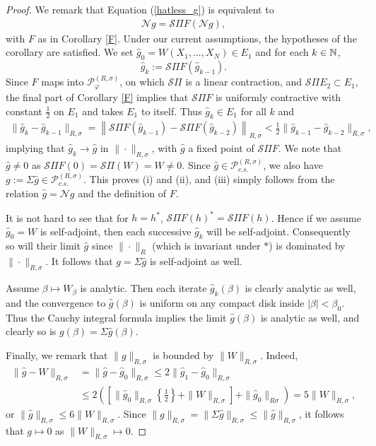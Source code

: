\begin{proof}
We remark that Equation (\ref{hatless_g}) is equivalent to
	\begin{align*}
		\mathscr{N}g=\mathscr{S}\Pi F(\mathscr{N} g),
	\end{align*}
with $F$ as in Corollary \ref{F}. Under our current assumptions, the hypotheses of the corollary are satisfied. We set $\hat{g}_0=W(X_1,\ldots, X_N)\in E_1$ and for each $k\in\mathbb{N}$,
	\begin{equation*}
		\hat{g}_k:=\mathscr{S}\Pi F(\hat{g}_{k-1}).
	\end{equation*}
Since $F$ maps into $\mathscr{P}_\varphi^{(R,\sigma)}$, on which $\mathscr{S}\Pi$ is a linear contraction, and $\mathscr{S}\Pi E_2\subset E_1$, the final part of Corollary \ref{F} implies that $\mathscr{S}\Pi F$ is uniformly contractive with constant $\frac{1}{2}$ on $E_1$ and takes $E_1$ to itself. Thus $\hat{g}_k\in E_1$ for all $k$ and
	\begin{align*}
		\| \hat{g}_k - \hat{g}_{k-1}\|_{R,\sigma}=\left\| \mathscr{S}\Pi F(\hat{g}_{k-1}) - \mathscr{S}\Pi F(\hat{g}_{k-2})\right\|_{R,\sigma} < \frac{1}{2} \| \hat{g}_{k-1} - \hat{g}_{k-2}\|_{R,\sigma},
	\end{align*}
implying that $\hat{g}_k\rightarrow \hat{g}$ in $\|\cdot\|_{R,\sigma}$, with $\hat{g}$ a fixed point of $\mathscr{S}\Pi F$. We note that $\hat{g}\neq 0$ as $\mathscr{S}\Pi F(0)=\mathscr{S}\Pi (W)=W\neq 0$. Since $\hat{g}\in \mathscr{P}_{c.s.}^{(R,\sigma)}$, we also have $g:=\Sigma \hat{g} \in \mathscr{P}_{c.s.}^{(R,\sigma)}$. This proves (i) and (ii), and (iii) simply follows from the relation $\hat{g}=\mathscr{N}g$ and the definition of $F$.\par
It is not hard to see that for $h=h^*$, $\mathscr{S}\Pi F( h)^*=\mathscr{S}\Pi F(h)$. Hence if we assume $\hat{g}_0=W$ is self-adjoint, then each successive $\hat{g}_k$ will be self-adjoint. Consequently so will their limit $\hat{g}$ since $\|\cdot\|_R$ (which is invariant under $*$) is dominated by $\|\cdot \|_{R,\sigma}$. It follows that $g=\Sigma \hat{g}$ is self-adjoint as well.\par
Assume $\beta\mapsto W_\beta$ is analytic. Then each iterate $\hat{g}_k(\beta)$ is clearly analytic as well, and the convergence to $\hat{g}(\beta)$ is uniform on any compact disk inside $|\beta|<\beta_0$. Thus the Cauchy integral formula implies the limit $\hat{g}(\beta)$ is analytic as well, and clearly so is $g(\beta)=\Sigma \hat{g}(\beta)$.\par
Finally, we remark that $\|g\|_{R,\sigma}$ is bounded by $\|W\|_{R,\sigma}$. Indeed,
	\begin{align*}
		\|\hat{g}- W\|_{R,\sigma}&=\| \hat{g}-\hat{g}_0\|_{R,\sigma} \leq 2\|\hat{g}_1-\hat{g}_0\|_{R,\sigma}\\
			& \leq 2\left( \left[\|\hat{g}_0\|_{R,\sigma}\left\{\frac{1}{2}\right\} + \|W\|_{R,\sigma}\right] + \|\hat{g}_0\|_{R\sigma} \right) = 5\|W\|_{R,\sigma},
	\end{align*}
or $\|\hat{g}\|_{R,\sigma}\leq 6\|W\|_{R,\sigma}$. Since $\|g\|_{R,\sigma} = \|\Sigma\hat{g}\|_{R,\sigma}\leq \|\hat{g}\|_{R,\sigma}$, it follows that $g\mapsto 0$ as $\|W\|_{R,\sigma} \mapsto 0$.
\end{proof}


